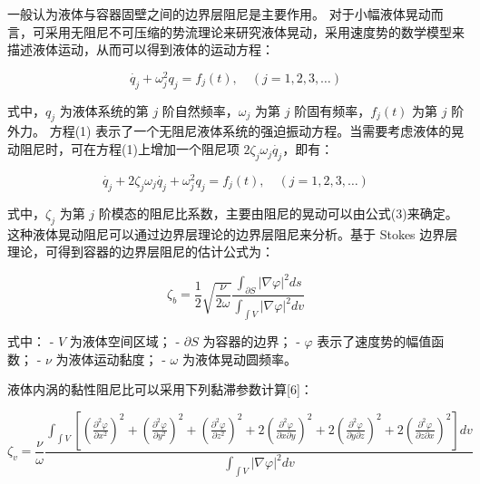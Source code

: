 \documentclass[12pt,hyperref,a4paper,UTF8]{ctexart}
\begin{document}
\begin{itemize}
        一般认为液体与容器固壁之间的边界层阻尼是主要作用。  
        对于小幅液体晃动而言，可采用无阻尼不可压缩的势流理论来研究液体晃动，采用速度势的数学模型来描述液体运动，从而可以得到液体的运动方程：
        
        \begin{equation}
        \dot{q_j} + \omega_j^2 q_j = f_j(t), \quad (j = 1, 2, 3, \dots)
        \end{equation}
        
        式中，$q_j$ 为液体系统的第 $j$ 阶自然频率，$\omega_j$ 为第 $j$ 阶固有频率，$f_j(t)$ 为第 $j$ 阶外力。  
        方程(1) 表示了一个无阻尼液体系统的强迫振动方程。当需要考虑液体的晃动阻尼时，可在方程(1)上增加一个阻尼项 $2\zeta_j\omega_j \dot{q_j}$，即有：
        
        \begin{equation}
        \dot{q_j} + 2\zeta_j\omega_j\dot{q_j} + \omega_j^2 q_j = f_j(t), \quad (j = 1, 2, 3, \dots)
        \end{equation}
        
        式中，$\zeta_j$ 为第 $j$ 阶模态的阻尼比系数，主要由阻尼的晃动可以由公式(3)来确定。  
        这种液体晃动阻尼可以通过边界层理论的边界层阻尼来分析。基于 Stokes 边界层理论，可得到容器的边界层阻尼的估计公式为：
        
        \begin{equation}
        \zeta_b = \frac{1}{2} \sqrt{\frac{\nu}{2\omega}} \frac{\int_{\partial S} |\nabla \varphi|^2 ds}{\int_{\int V} |\nabla \varphi|^2 dv}
        \end{equation}
        
        式中：
        - $V$ 为液体空间区域；
        - $\partial S$ 为容器的边界；
        - $\varphi$ 表示了速度势的幅值函数；
        - $\nu$ 为液体运动黏度；
        - $\omega$ 为液体晃动圆频率。
        
        液体内涡的黏性阻尼比可以采用下列黏滞参数计算[6]：
        
        \begin{equation}
        \zeta_v = \frac{\nu}{\omega} \frac{\int_{\int V} \left[ 
        \left(\frac{\partial^2 \varphi}{\partial x^2}\right)^2 + 
        \left(\frac{\partial^2 \varphi}{\partial y^2}\right)^2 + 
        \left(\frac{\partial^2 \varphi}{\partial z^2}\right)^2 + 
        2\left(\frac{\partial^2 \varphi}{\partial x \partial y}\right)^2 + 
        2\left(\frac{\partial^2 \varphi}{\partial y \partial z}\right)^2 + 
        2\left(\frac{\partial^2 \varphi}{\partial z \partial x}\right)^2
        \right] dv}
        {\int_{\int V} |\nabla \varphi|^2 dv}
        \end{equation}
        

\end{itemize}
\end{document}
